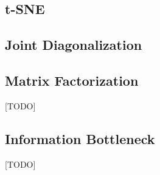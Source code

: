 \documentclass[12pt,a4paper]{article}
\begin{document}
\subsection{t-SNE}
\cite{maaten2008visualizing}


\subsection{Joint Diagonalization}
\cite{JSSv076i02}


\subsection{Matrix Factorization}
\label{sec:matrix_factorization}
[TODO]



\subsection{Information Bottleneck}
[TODO]

%
%
%


\begin{remark}
\end{remark}
\end{document}
